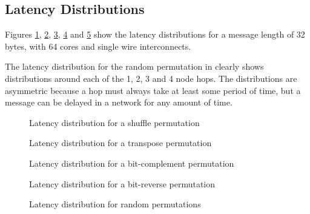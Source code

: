 \subsection{Latency Distributions}

Figures \ref{fig:shuffle}, \ref{fig:transpose}, \ref{fig:bitcomp},
\ref{fig:bitrev} and \ref{fig:random} show the latency distributions for a
message length of 32 bytes, with 64 cores and single wire interconnects.

The latency distribution for the random permutation in  clearly
shows distributions around each of the 1, 2, 3 and 4 node hops. The
distributions are asymmetric because a hop must always take at least some period
of time, but a message can be delayed in a network for any amount of time.

\begin{figure}
\centering

\caption{Latency distribution for a shuffle permutation}
\label{fig:shuffle}
\end{figure}

\begin{figure}
\centering

\caption{Latency distribution for a transpose permutation}
\label{fig:transpose}
\end{figure}

\begin{figure}
\centering

\caption{Latency distribution for a bit-complement permutation}
\label{fig:bitcomp}
\end{figure}

\begin{figure}
\centering

\caption{Latency distribution for a bit-reverse permutation}
\label{fig:bitrev}
\end{figure}

\begin{figure}
\centering

\caption{Latency distribution for random permutations}
\label{fig:random}
\end{figure}

